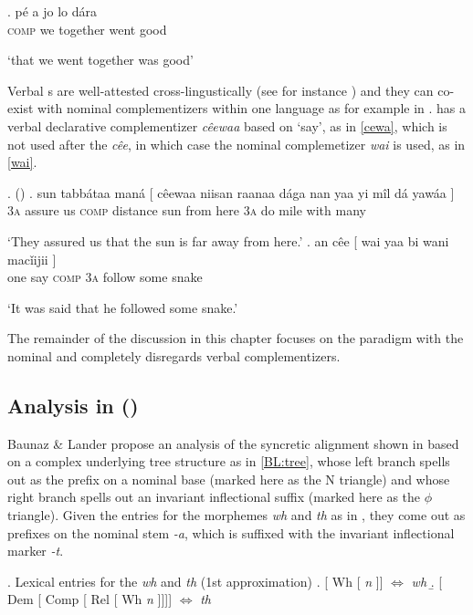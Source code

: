 \exg.
p\'e a jo lo d\'ara\\
\textsc{comp} we together went good\\
\strut `that we went together was good'\label{Yayaya}

Verbal s are well-attested cross-lingustically (see for instance \citealt{DixonAik2006}) and they can co-exist with nominal complementizers within one language as for example in .  has a verbal declarative complementizer \textit{c\^eewaa} based on `say', as in \ref{cewa}, which is not used after the   \textit{c\^ee}, in which case  the nominal complemetizer \textit{wai} is used, as in \ref{wai}.

\ex.  (\citealt[96--97]{Dimm1989})\label{Hausa}
\ag. sun tabb\'ataa man\'a [ c\^eewaa niisan raanaa d\'aga nan yaa yi m\^il d\'a {yaw\'aa ]}\\
\textsc{3a} assure us {} \textsc{comp} distance sun from here \textsc{3a} do mile with {many }\\
\strut `They assured us that the sun is far away from here.'\label{cewa}
\bg. an c\^ee [ wai yaa bi wani {mac\v{i}ijii ]}\\
one say {} \textsc{comp} \textsc{3a} follow some {snake }\\
\strut `It was said that he followed some snake.' \label{wai}

The remainder of the discussion in this chapter focuses on the paradigm with the nominal  and completely disregards verbal complementizers.

\subsection{Analysis in \citeauthor{BaunazLander2017} (\citeyear{BaunazLander2017,BaunazLander2018})}

Baunaz \& Lander propose an analysis of the syncretic alignment shown in  
based on a complex underlying tree structure as in \ref{BL:tree}, whose left branch spells out as the prefix on a nominal base (marked here as the N triangle) and whose right branch spells out an invariant inflectional suffix (marked here as the $\phi$ triangle). Given the entries  for the  morphemes \textit{wh} and \textit{th} as in \Next, they come out as prefixes on the nominal stem \textit{-a}, which is suffixed with the invariant inflectional marker \textit{-t}.

\ex. Lexical entries for the  \textit{wh} and \textit{th} (1st approximation)\label{Eng:1stapprox}
\a. [ Wh [ \textit{n} ]] $\Leftrightarrow$ \textit{wh}\label{old-wh}
\b. [ Dem [ Comp [ Rel [ Wh \textit{n} ]]]] $\Leftrightarrow$ \textit{th}\label{old-th}

